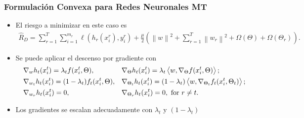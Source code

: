 \documentclass{beamer}
\newcommand{\norm}[1]{\left\lVert#1\right\rVert}
\newcommand{\dotp}[2]{\bm{\left\langle} #1, #2 \bm{\right\rangle}}
\newcommand{\ntasks}{T}
\newcommand{\lossf}{\ell}
\newcommand{\sample}{D}
\newcommand{\risk}{R}
\newcommand{\emprisk}{\hat{\risk}_{\sample}}
\begin{document}
\begin{frame}
      \frametitle{Formulación Convexa para Redes Neuronales MT}

      \begin{itemize}
            \item El riesgo a minimizar en este caso es
            \begin{equation}
                  \nonumber
                  \begin{aligned}
                      \emprisk = \sum_{r=1}^\ntasks \sum_{i=1}^{m_r} \lossf(h_r(x_i^r), y_i^r) + \frac{\mu}{2} \left( \norm{w}^2 + \sum_{r=1}^\ntasks \norm{w_r}^2 + \Omega(\Theta) + \Omega(\Theta_r)\right) .
                  \end{aligned}
            \end{equation}
            \item Se puede aplicar el descenso por gradiente con
            \begin{equation}\nonumber
                  \begin{aligned}       
                      &\nabla_{w} h_t(x_i^t)  
                      = \lambda_t  f(x_i^t, \Theta) ,
                      &&\nabla_{\Theta} h_t(x_i^t)  
                      = \lambda_t  \dotp{w}{\nabla_\Theta f(x_i^t, \Theta)} ; \\
                      &\nabla_{w_t} h_t(x_i^t)  
                      = (1 - \lambda_t)  f_t(x_i^t, \Theta) ,
                      &&\nabla_{\Theta_t} h_t(x_i^t)  
                      = (1 - \lambda_t)   \dotp{w}{\nabla_{\Theta_t} f_t(x_i^t, \Theta_t)} ; \\
                      &\nabla_{w_r} h_t(x_i^t)  
                      =  0 , 
                      &&\nabla_{\Theta_r} h_t(x_i^t)  
                      =  0 , \text{ for } r \neq t .\\
                  \end{aligned}    
              \end{equation}
            \item Los gradientes se escalan adecuadamente con $\lambda_t$ y $(1 - \lambda_t)$
      \end{itemize}

\end{frame}
\end{document}
